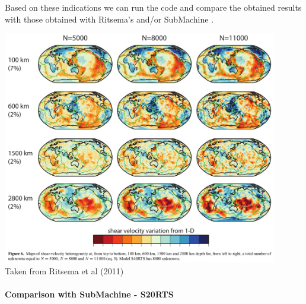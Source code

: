 Based on these indications we can run the code and compare the obtained results 
with those obtained with Ritsema's and/or SubMachine \cite{homs18}.

\begin{center}
\includegraphics[width=12cm]{python_codes/fieldstone_85/images/ridv11}\\
{\captionfont Taken from Ritsema et al (2011) \cite{ridv11}}
\end{center}


\newpage
\paragraph{Comparison with SubMachine - S20RTS}

